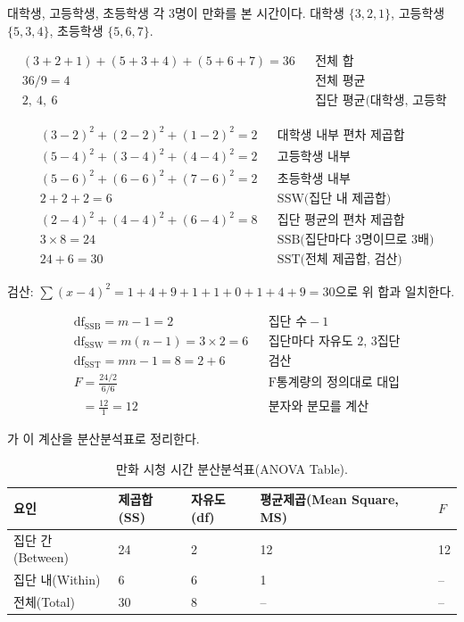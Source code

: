 \begin{example}[만화 시청 시간]
\label{ex:cd-cartoon}
대학생, 고등학생, 초등학생 각 3명이 만화를 본 시간이다. 대학생
$\{3, 2, 1\}$, 고등학생 $\{5, 3, 4\}$, 초등학생 $\{5, 6, 7\}$.

\begin{align*}
  &(3+2+1)+(5+3+4)+(5+6+7) = 36 && \text{전체 합}\\
  &36/9 = 4 && \text{전체 평균}\\
  &2,\ 4,\ 6 && \text{집단 평균(대학생, 고등학생, 초등학생)}
\end{align*}

\begin{align*}
  &(3{-}2)^2{+}(2{-}2)^2{+}(1{-}2)^2 = 2 && \text{대학생 내부 편차 제곱합}\\
  &(5{-}4)^2{+}(3{-}4)^2{+}(4{-}4)^2 = 2 && \text{고등학생 내부}\\
  &(5{-}6)^2{+}(6{-}6)^2{+}(7{-}6)^2 = 2 && \text{초등학생 내부}\\
  &2+2+2 = 6 && \text{SSW(집단 내 제곱합)}\\
  &(2{-}4)^2+(4{-}4)^2+(6{-}4)^2 = 8 && \text{집단 평균의 편차 제곱합}\\
  &3 \times 8 = 24 && \text{SSB(집단마다 3명이므로 3배)}\\
  &24 + 6 = 30 && \text{SST(전체 제곱합, 검산)}
\end{align*}

검산: $\sum (x-4)^2 = 1+4+9+1+1+0+1+4+9 = 30$으로 위 합과 일치한다.

\begin{align*}
  &\text{df}_{\text{SSB}} = m - 1 = 2 && \text{집단 수} - 1\\
  &\text{df}_{\text{SSW}} = m(n-1) = 3 \times 2 = 6 && \text{집단마다 자유도 2, 3집단}\\
  &\text{df}_{\text{SST}} = mn - 1 = 8 = 2 + 6 && \text{검산}\\
  &F = \frac{24/2}{6/6} && \text{F통계량의 정의대로 대입}\\
  &\phantom{F} = \frac{12}{1} = 12 && \text{분자와 분모를 계산}
\end{align*}

가 이 계산을 분산분석표로 정리한다.

\begin{table}[H]\centering
\begin{tabularx}{\linewidth}{@{}l X X X X@{}}
\toprule
요인 & 제곱합(SS) & 자유도(df) & 평균제곱(Mean Square, MS) & $F$ \\
\midrule
집단 간(Between) & 24 & 2 & 12 & 12 \\
\midrule
집단 내(Within) & 6 & 6 & 1 & -- \\
\midrule
전체(Total) & 30 & 8 & -- & -- \\
\bottomrule
\end{tabularx}
\caption{만화 시청 시간 분산분석표(ANOVA Table).}
\label{tab:cd-anova}
\end{table}


\end{example}
